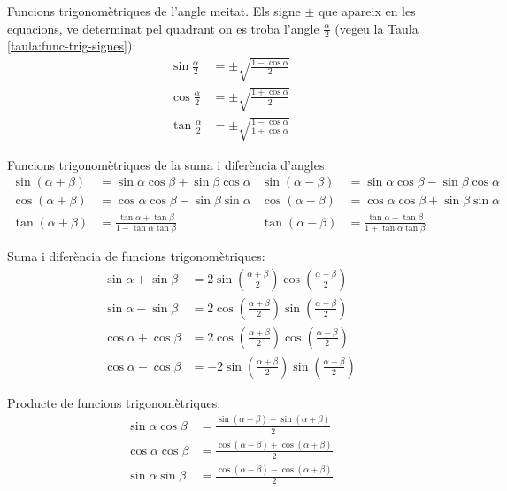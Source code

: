 Funcions trigonom\`{e}triques de l'angle meitat. Els signe $\pm$ que
apareix en les equacions, ve determinat pel quadrant on es troba
l'angle $\frac{\alpha}{2}$ (vegeu la Taula
\vref{taula:func-trig-signes}):
\begin{subequations}
\begin{align}
    \sin \frac{\alpha}{2} &= \pm \sqrt{\frac{1-\cos\alpha}{2}}\\[1ex]
    \cos \frac{\alpha}{2} &= \pm \sqrt{\frac{1+\cos\alpha}{2}}\\[1ex]
    \tan \frac{\alpha}{2} &= \pm \sqrt{\frac{1-\cos\alpha}{1+\cos\alpha}}
\end{align}
\end{subequations}


Funcions trigonom\`{e}triques de la suma i difer\`{e}ncia d'angles:
\begin{subequations}
\begin{align}
    \sin(\alpha+\beta) &= \sin\alpha \cos\beta + \sin\beta\cos\alpha &
    \sin(\alpha-\beta) &= \sin\alpha \cos\beta - \sin\beta\cos\alpha\\[1ex]
    \cos(\alpha+\beta) &= \cos\alpha \cos\beta - \sin\beta\sin\alpha &
    \cos(\alpha-\beta) &= \cos\alpha \cos\beta + \sin\beta\sin\alpha\\[1ex]
    \tan(\alpha+\beta) &=\frac{\tan\alpha+\tan\beta}{1-\tan\alpha\tan\beta} &
    \tan(\alpha-\beta)
    &=\frac{\tan\alpha-\tan\beta}{1+\tan\alpha\tan\beta}
\end{align}
\end{subequations}

Suma i difer\`{e}ncia de funcions trigonom\`{e}triques:
\begin{subequations}
\begin{align}
    \sin\alpha+\sin\beta &= 2 \sin\left(\frac{\alpha+\beta}{2}\right)
    \cos\left(\frac{\alpha-\beta}{2}\right)\\[1ex]
    \sin\alpha-\sin\beta &= 2 \cos\left(\frac{\alpha+\beta}{2}\right)
    \sin\left(\frac{\alpha-\beta}{2}\right)\\[1ex]
    \cos\alpha+\cos\beta &= 2 \cos\left(\frac{\alpha+\beta}{2}\right)
    \cos\left(\frac{\alpha-\beta}{2}\right)\\[1ex]
    \cos\alpha-\cos\beta &= -2 \sin\left(\frac{\alpha+\beta}{2}\right)
    \sin\left(\frac{\alpha-\beta}{2}\right)
\end{align}
\end{subequations}

Producte de funcions trigonom\`{e}triques:
\begin{subequations}
\begin{align}
    \sin\alpha \cos\beta &=
    \frac{\sin(\alpha-\beta)+\sin(\alpha+\beta)}{2}\\[1ex]
    \cos\alpha \cos\beta &=
    \frac{\cos(\alpha-\beta)+\cos(\alpha+\beta)}{2}\\[1ex]
    \sin\alpha \sin\beta &=
    \frac{\cos(\alpha-\beta)-\cos(\alpha+\beta)}{2}
\end{align}
\end{subequations}

